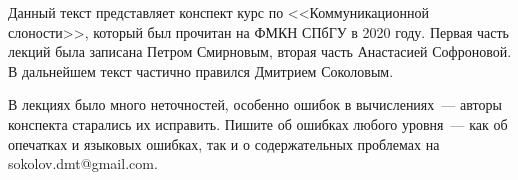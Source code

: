 Данный текст представляет конспект курс по <<Коммуникационной слоности>>, который был прочитан на ФМКН
СПбГУ в 2020 году. Первая часть лекций была записана Петром Смирновым, вторая часть Анастасией
Софроновой. В дальнейшем текст частично правился Дмитрием Соколовым.

В лекциях было много неточностей, особенно ошибок в вычислениях~--- авторы конспекта старались их
исправить. Пишите об ошибках любого уровня~--- как об опечатках и языковых ошибках, так и о
содержательных проблемах на sokolov.dmt@gmail.com.